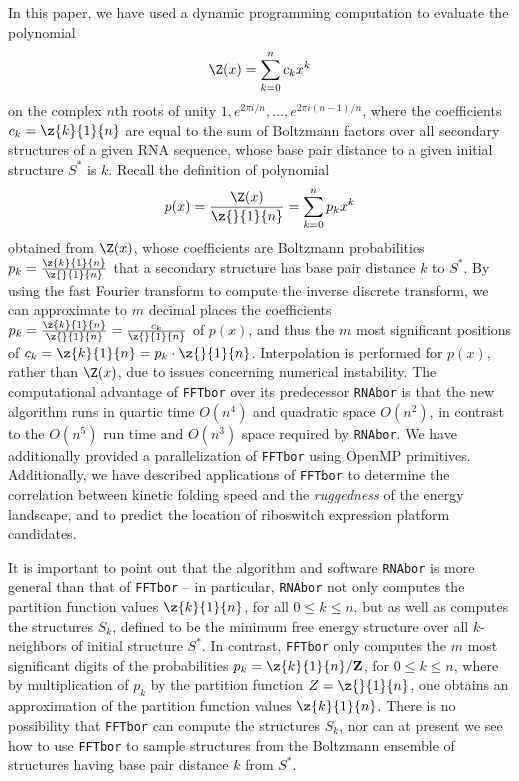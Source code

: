 In this paper, we have used a dynamic programming computation to
evaluate the polynomial
\begin{eqnarray}
\Z(x) = \sum_{k=0}^n c_k x^k
\end{eqnarray}
on the complex $n$th roots of unity $1,e^{2 \pi i/n},\ldots,
e^{2 \pi i (n-1)/n}$,
where the coefficients $c_k=\z{k}{1}{n}$ are equal to the sum of
Boltzmann factors over all secondary structures of a given RNA
sequence, whose base pair distance to a given initial structure $S^*$
is $k$.  Recall the definition of polynomial
\begin{eqnarray}
p(x) = \frac{\Z(x)}{\z{}{1}{n}} = \sum_{k=0}^n p_k x^k
\end{eqnarray}
obtained from $\Z(x)$, whose coefficients are Boltzmann
probabilities $p_k=\frac{\z{k}{1}{n}}{\z{}{1}{n}}$ that a secondary
structure has base pair distance $k$ to $S^*$.
By using the fast Fourier transform to compute the inverse
discrete transform, we can approximate  to $m$ decimal places the coefficients
$p_k=\frac{\z{k}{1}{n}}{\z{}{1}{n}} =\frac{c_k}{\z{}{1}{n}}$ of $p(x)$, and
thus the $m$ most significant positions of
$c_k=\z{k}{1}{n}=p_k \cdot \z{}{1}{n}$. Interpolation is performed for
$p(x)$, rather than $\Z(x)$, due to issues concerning numerical instability.
The computational advantage of {\tt FFTbor} over its predecessor
{\tt RNAbor} \cite{Freyhult.b07} is that
the new algorithm runs in quartic time $O(n^4)$ and quadratic space
$O(n^2)$, in contrast to the $O(n^5)$ run time and $O(n^3)$ space
required by {\tt RNAbor}. We have additionally provided a
parallelization of {\tt FFTbor} using OpenMP primitives.
Additionally, we have
described applications of {\tt FFTbor} to determine the
correlation between kinetic folding speed and the {\em ruggedness}
of the energy landscape, and to predict the location of riboswitch
expression platform candidates.

It is important to point out that
the algorithm and software {\tt RNAbor} is more general than
that of {\tt FFTbor} -- in particular, {\tt RNAbor} not only computes the
partition function values $\z{k}{1}{n}$, for all $0 \leq k \leq n$, but as
well as computes the
structures $S_k$, defined to be the minimum free energy structure over all
$k$-neighbors of initial structure $S^*$.
In contrast, {\tt FFTbor} only computes the $m$ most significant digits of
the probabilities $p_k = \z{k}{1}{n}/{\bf Z}$, for $0 \leq k \leq n$, where
by multiplication of $p_k$ by the partition function $Z=\z{}{1}{n}$,
one obtains an approximation of the partition function values $\z{k}{1}{n}$.
There is no possibility that {\tt FFTbor} can compute the structures $S_k$,
nor can at present we see how to use {\tt FFTbor} to sample structures from
the Boltzmann ensemble of structures having base pair distance $k$ from $S^*$.

